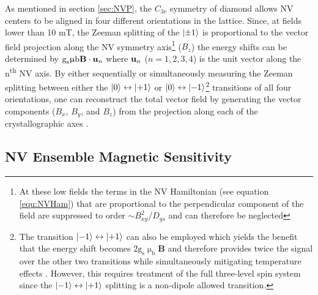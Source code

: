 As mentioned in section \ref{sec:NVP}, the $C_{3v}$ symmetry of diamond allows NV centers to be aligned in four different orientations in the lattice. Since, at fields lower than 10 mT, the Zeeman splitting of the $\ket{\pm 1}$ is proportional to the vector field projection along the NV symmetry axis\footnote{At these low fields the terms in the NV Hamiltonian (see equation \ref{equ:NVHam}) that are proportional to the perpendicular component of the field are suppressed to order $\sim B_{xy}^2 / D_{gs}$ and can therefore be neglected\cite{taylor2008high}} ($B_z$) the energy shifts can be determined by $\text{g}_\text{s} \upmu \text{b}\textbf{B} \cdot \textbf{\text{u}}_n$ where $\textbf{\text{u}}_n$ ($n = 1,2,3,4$) is the unit vector along the n\textsuperscript{th} NV axis. By either sequentially or simultaneously measuring the Zeeman splitting between either the $\ket{0} \leftrightarrow \ket{+1}$ or $\ket{0} \leftrightarrow \ket{-1}$\footnote{The transition $\ket{-1} \leftrightarrow \ket{+1}$ can also be employed which yields the benefit that the energy shift becomes $2\text{g}_\text{s}\upmu_\text{b}\textbf{B}$ and therefore provides twice the signal over the other two transitions while simultaneously mitigating temperature effects \cite{neumann2013high}. However, this requires treatment of the full three-level spin system since the $\ket{-1} \leftrightarrow \ket{+1}$ splitting is a non-dipole allowed transition.} transitions of all four orientations, one can reconstruct the total vector field by generating the vector components ($B_x$, $B_y$, and $B_z$) from the projection along each of the crystallographic axes \cite{kitazawa2017vector,schloss2018simultaneous}.

\subsection{NV Ensemble Magnetic Sensitivity}







